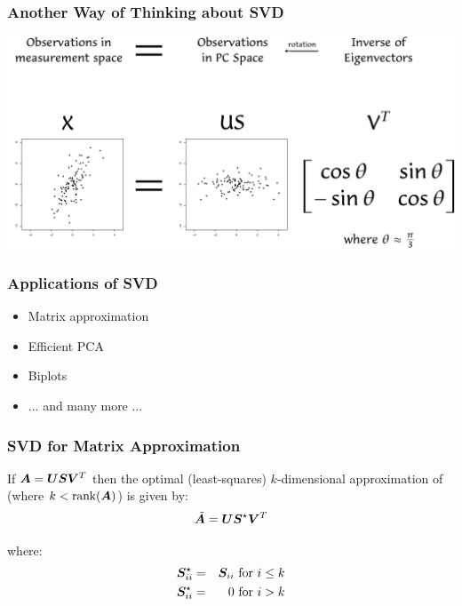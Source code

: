 \documentclass{beamer}
\DeclareMathOperator{\rank}{rank}
\begin{document}
\begin{frame}
  \frametitle{Another Way of Thinking about SVD}


\begin{center}
\includegraphics[width=\textwidth]{fig-svdpca}
\end{center}

\end{frame}



\begin{frame}
  \frametitle{Applications of SVD}

\begin{itemize}
\item Matrix approximation
\item Efficient PCA
\item Biplots
\item ... and many more ...
\end{itemize}

\end{frame}


\begin{frame}
  \frametitle{SVD for Matrix Approximation}

If $ \bm{A} = \bm{U} \bm{S} \bm{V}^T $
then the optimal (least-squares) $k$-dimensional approximation of  (where $ k < \rank(\Mtx{A})$) is given by:
\[
\tilde{\bm{A}} = \bm{U}\bm{S}^{\star} \bm{V}^T
\]

where:
\begin{eqnarray*}
\bm{S}_{ii}^{\star} &=& \bm{S}_{ii} \text{ for } i \leq k\\
\bm{S}_{ii}^{\star} &=& 0 \text{ for } i > k\\
\end{eqnarray*}

\end{frame}
\end{document}
